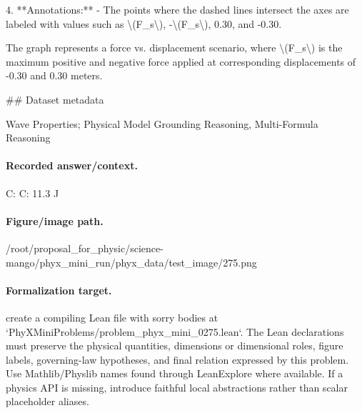 4. **Annotations:**
   - The points where the dashed lines intersect the axes are labeled with values such as \textbackslash{}(F\_s\textbackslash{}), -\textbackslash{}(F\_s\textbackslash{}), 0.30, and -0.30.

The graph represents a force vs. displacement scenario, where \textbackslash{}(F\_s\textbackslash{}) is the maximum positive and negative force applied at corresponding displacements of -0.30 and 0.30 meters.

\#\# Dataset metadata

Wave Properties; Physical Model Grounding Reasoning, Multi-Formula Reasoning

\paragraph{Recorded answer/context.}
C: C: 11.3 J

\paragraph{Figure/image path.}
/root/proposal\_for\_physic/science-mango/phyx\_mini\_run/phyx\_data/test\_image/275.png

\paragraph{Formalization target.}
create a compiling Lean file with sorry bodies at `PhyXMiniProblems/problem\_phyx\_mini\_0275.lean`. The Lean declarations must preserve the physical quantities, dimensions or dimensional roles, figure labels, governing-law hypotheses, and final relation expressed by this problem.
Use Mathlib/Physlib names found through LeanExplore where available. If a physics API is missing, introduce faithful local abstractions rather than scalar placeholder aliases.

